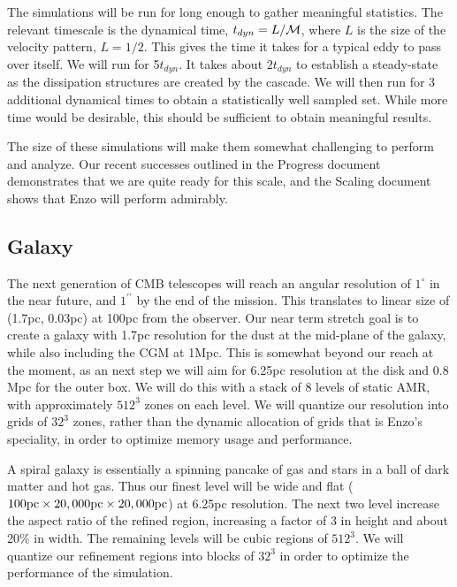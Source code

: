 The simulations will be run for long enough to gather meaningful statistics.
The relevant timescale is the dynamical time, $t_{dyn}=L/\mathcal{M}$, where $L$ is
the size of the velocity pattern, $L=1/2$.  This gives the time it takes for a
typical eddy to pass over itself.  We will run for 5$t_{dyn}$.  It takes about $2 t_{dyn}$ to establish a
steady-state as the dissipation structures are created by the cascade.  We will
then run for 3 additional dynamical times to obtain a statistically well sampled
set.  While more time would be desirable, this should be sufficient to obtain
meaningful results.

The size of these simulations will make them somewhat challenging to perform and
analyze.  Our recent successes outlined in the Progress document demonstrates
that we are quite ready for this scale, and the Scaling document shows that Enzo
will perform admirably.  

\subsection{Galaxy}

The next generation of CMB telescopes will reach an angular resolution of
$1^\circ$ in the near future, and $1^{\prime\prime}$ by the end of the mission.
This translates to linear size of (1.7pc, 0.03pc) at 100pc from the
observer.  Our near term stretch goal is to create a galaxy with 1.7pc
resolution for the dust at the mid-plane of the galaxy, while
also including the CGM at 1Mpc.  This is somewhat beyond our reach at the
moment, as an next step we will aim for 6.25pc resolution at the disk
and $0.8$Mpc for the outer box.  We will do
this with a stack of 8 levels of static AMR, with approximately $512^3$ zones on each
level.  We will quantize our resolution into grids of $32^3$ zones, rather than
the dynamic allocation of grids that is Enzo's speciality, in order to optimize
memory usage and performance.  

A spiral galaxy is essentially a spinning pancake of gas and stars in a ball of dark
matter and hot gas.   Thus our finest level will be wide and
flat ($100\rm{pc}\times 20,000 \rm{pc} \times 20,000 \rm{pc}$) at 6.25pc
resolution.  The next two level increase the aspect ratio of the refined region,
increasing a factor of 3 in height and about 20\% in width.  The remaining
levels will be cubic regions of $512^3$.  We will quantize our refinement
regions into blocks of $32^3$ in order to optimize the performance of the
simulation.

